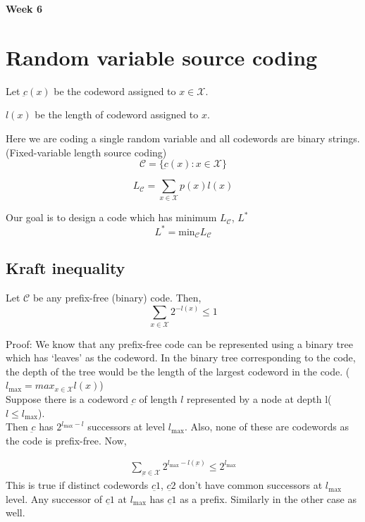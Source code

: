 \documentclass{article}
\begin{document}
\begin{center}
\textbf{\huge{Week 6}}
\end{center}

\section{Random variable source coding}

Let $\underbar{c}(x)$ be the codeword assigned to $x \in \mathcal{X}$.

$l(x)$ be the length of codeword assigned to $x$.

Here we are coding a single random variable and all codewords are binary strings. (Fixed-variable length source coding)
$$ \mathscr{C}= \{ \underbar{c}(x): x \in \mathcal{X}\}$$

$$ L_{\mathscr{C}}= \sum_{x \in \mathcal{X}}p(x)l(x)$$

Our goal is to design a code which has minimum $L_{\mathscr{C}}$, $L^{*}$
$$L^{*} = \text{min}_{\mathscr{C}} L_{\mathscr{C}}$$

\subsection{Kraft inequality}

Let $\mathscr{C}$ be any prefix-free (binary) code. Then,
$$ \sum_{x \in \mathcal{X}} 2^{-l(x)} \leq 1$$

Proof: We know that any prefix-free code can be represented using a binary tree which has `leaves' as the codeword. In the binary tree corresponding to the code, the depth of the tree would be the length of the largest codeword in the code. ($l_{\text{max}}=max_{x \in \mathcal{X}} l(x)$)\\

Suppose there is a codeword $\underbar{c}$ of length $l$ represented by a node at depth l($l \leq l_{\text{max}}$).\\

Then $\underbar{c}$ has $2^{l_{\text{max}}-l}$ successors at level $l_{\text{max}}$. Also, none of these are codewords as the code is prefix-free. Now,

\begin{align}
    \sum_{\underbar{x} \in \mathcal{X}} 2^{l_{\text{max}}-l(\underbar{x})} \leq 2^{l_{\text{max}}}
\end{align}
This is true if distinct codewords $\underbar{c1}$, $\underbar{c2}$ don't have common successors at $l_{\text{max}}$ level. Any successor of $\underbar{c1}$ at $l_{\text{max}}$ has $\underbar{c1}$ as a prefix. Similarly in the other case as well.
\end{document}
